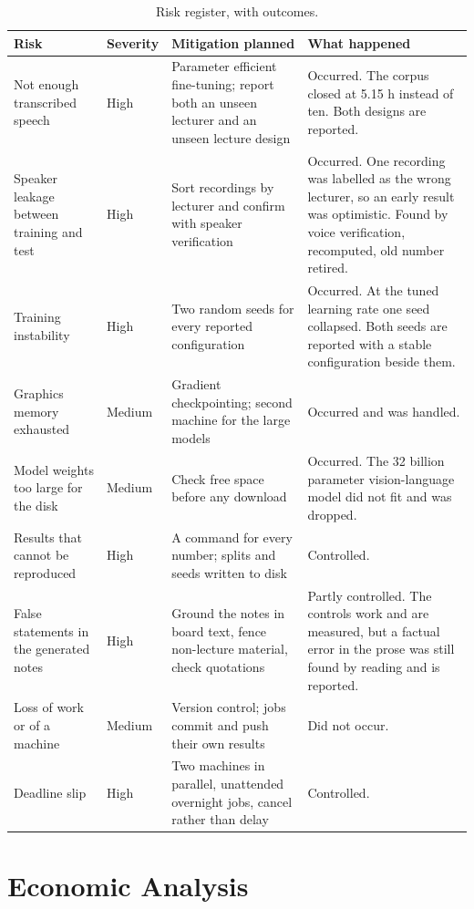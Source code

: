 \begin{table}[htbp]
\centering
\caption{Risk register, with outcomes.}
\label{tab:risks}
\small
\begin{tabular}{p{2.8cm}p{1.2cm}p{4.4cm}p{5.0cm}}
\toprule
Risk & Severity & Mitigation planned & What happened \\
\midrule
Not enough transcribed speech & High &
Parameter efficient fine-tuning; report both an unseen lecturer and an unseen lecture
design &
Occurred. The corpus closed at 5.15 h instead of ten. Both designs are reported. \\
\addlinespace
Speaker leakage between training and test & High &
Sort recordings by lecturer and confirm with speaker verification &
Occurred. One recording was labelled as the wrong lecturer, so an early result was
optimistic. Found by voice verification, recomputed, old number retired. \\
\addlinespace
Training instability & High &
Two random seeds for every reported configuration &
Occurred. At the tuned learning rate one seed collapsed. Both seeds are reported with a
stable configuration beside them. \\
\addlinespace
Graphics memory exhausted & Medium &
Gradient checkpointing; second machine for the large models &
Occurred and was handled. \\
\addlinespace
Model weights too large for the disk & Medium &
Check free space before any download &
Occurred. The 32 billion parameter vision-language model did not fit and was dropped. \\
\addlinespace
Results that cannot be reproduced & High &
A command for every number; splits and seeds written to disk &
Controlled. \\
\addlinespace
False statements in the generated notes & High &
Ground the notes in board text, fence non-lecture material, check quotations &
Partly controlled. The controls work and are measured, but a factual error in the prose
was still found by reading and is reported. \\
\addlinespace
Loss of work or of a machine & Medium &
Version control; jobs commit and push their own results & Did not occur. \\
\addlinespace
Deadline slip & High &
Two machines in parallel, unattended overnight jobs, cancel rather than delay &
Controlled. \\
\bottomrule
\end{tabular}
\end{table}

\section{Economic Analysis}

